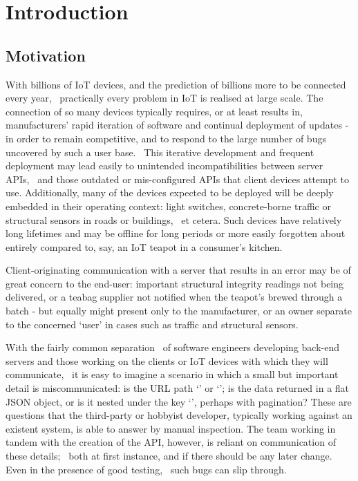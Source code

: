 \section{Introduction}\label{intro}
\subsection{Motivation}\label{intro:motivation}

With billions of IoT devices, and the prediction of billions more to be connected every year,~\cite{gartner_billions_iot, iot_forecast_update} practically every problem in IoT is realised at large scale. The connection of so many devices typically requires, or at least results in, manufacturers' rapid iteration of software and continual deployment of updates - in order to remain competitive, and to respond to the large number of bugs uncovered by such a user base.~\cite{cd_for_iot,iot_software_release} This iterative development and frequent deployment may lead easily to unintended incompatibilities between server APIs,~\cite{client_server_coupling} and those outdated or mis-configured APIs that client devices attempt to use. Additionally, many of the devices expected to be deployed will be deeply embedded in their operating context: light switches, concrete-borne traffic or structural sensors in roads or buildings,~\cite{construction_and_iot, smart_concrete} et cetera. Such devices have relatively long lifetimes and may be offline for long periods or more easily forgotten about entirely compared to, say, an IoT teapot in a consumer's kitchen.

Client-originating communication with a server that results in an error may be of great concern to the end-user: important structural integrity readings not being delivered, or a teabag supplier not notified when the teapot's brewed through a batch - but equally might present only to the manufacturer, or an owner separate to the concerned `user' in cases such as traffic and structural sensors.

With the fairly common separation~\cite{backend_for_frontend, front_backend_keep_separate, front_backend_separation_of_concerns} of software engineers developing back-end servers and those working on the clients or IoT devices with which they will communicate,~\cite{fielding_rest} it is easy to imagine a scenario in which a small but important detail is miscommunicated: is the URL path `' or `'; is the data returned in a flat JSON object, or is it nested under the key `', perhaps with pagination? These are questions that the third-party or hobbyist developer, typically working against an existent system, is able to answer by manual inspection. The team working in tandem with the creation of the API, however, is reliant on communication of these details;~\cite{team_comms_silo} both at first instance, and if there should be any later change. Even in the presence of good testing,~\cite{front_backend_testing} such bugs can slip through.

